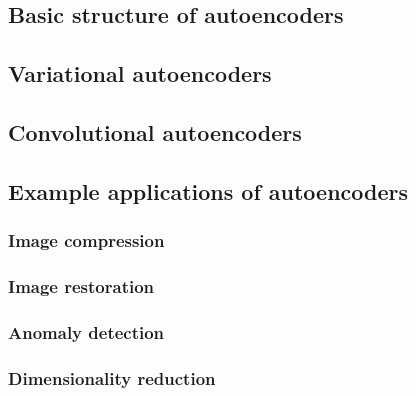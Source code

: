 \subsection{Basic structure of autoencoders}

\subsection{Variational autoencoders}

\subsection{Convolutional autoencoders}

\subsection{Example applications of autoencoders}

\subsubsection{Image compression}
\subsubsection{Image restoration}
\subsubsection{Anomaly detection}
\subsubsection{Dimensionality reduction}
